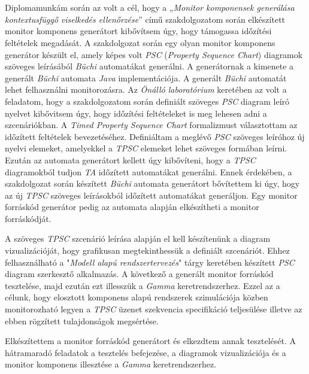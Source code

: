 \chapter{\bevezetes}
Diplomamunkám során az volt a cél, hogy a „\textit{Monitor komponensek generálása kontextusfüggő viselkedés ellenőrzése}” című szakdolgozatom során elkészített monitor komponens generátort kibővítsem úgy, hogy támogassa időzítési feltételek megadását.
A szakdolgozat során egy olyan monitor komponens generátor készült el, amely képes volt \textit{PSC} (\textit{Property Sequence Chart}) diagramok szöveges leírásából \textit{Büchi} automatákat generálni.
A generátornak a kimenete a generált \textit{Büchi} automata \textit{Java} implementációja.
A generált \textit{Büchi} automatát lehet felhasználni monitorozásra.
Az \textit{Önálló laboratórium} keretében az volt a feladatom, hogy a szakdolgozatom során definiált szöveges \textit{PSC} diagram leíró nyelvet kibővitsem úgy, hogy időzítési feltételeket is meg lehesen adni a szcenáriókban.
A \textit{Timed Property Sequence Chart} formalizmust választottam az időzített feltételek bevezetéséhez.
Definiáltam a meglévő \textit{PSC} szöveges leíróhoz új nyelvi elemeket, amelyekkel a \textit{TPSC} elemeket lehet szöveges formában leírni.
Ezután az automata generátort kellett úgy kibővíteni, hogy a \textit{TPSC} diagramokból tudjon \textit{TA} időzített automatákat generálni.
Ennek érdekében, a szakdolgozat során készített \textit{Büchi} automata generátort bővítettem ki úgy, hogy az új \textit{TPSC} szöveges leírásokból időzített automatákat generáljon.
Egy monitor forráskód generátor pedig az automata alapján elkészítheti a monitor forráskódját.

A szöveges \textit{TPSC} szcenárió leírása alapján el kell készítenünk a diagram vizualizációját, hogy grafikusan megtekinthessük a definiált szcenáriót.
Ehhez felhasználható a "\textit{Modell alapú rendszertervezés}" tárgy keretében készített \textit{PSC} diagram szerkesztő alkalmazás.
A következő a generált monitor forráskód tesztelése, majd ezután ezt illesszük a \textit{Gamma} keretrendszerhez.
Ezzel az a célunk, hogy elosztott komponens alapú rendszerek szimulációja közben monitorozható legyen a \textit{TPSC} üzenet szekvencia specifikáció teljesülése illetve az ebben rögzített tulajdonságok megsértése.

Elkészítettem a monitor forráskód generátort és elkezdtem annak tesztelését.
A hátramaradó feladatok a tesztelés befejezése, a diagramok vizualizációja és a monitor komponens illesztése a \textit{Gamma} keretrendszerhez.

